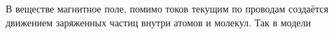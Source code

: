 В веществе магнитное поле, помимо токов текущим по проводам создаётся движением заряженных частиц внутри атомов и молекул. Так в модели